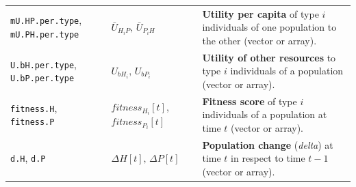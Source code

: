 \documentclass[
]{book}
\begin{document}
\begin{longtable}[]{@{}lll@{}}
\begin{minipage}[t]{0.36\columnwidth}
\texttt{mU.HP.per.type}, \texttt{mU.PH.per.type}\strut
\end{minipage} & \begin{minipage}[t]{0.21\columnwidth}\raggedright
\(\bar{U}_{H_{i}P},\,\bar{U}_{P_{i}H}\)\strut
\end{minipage} & \begin{minipage}[t]{0.34\columnwidth}\raggedright
\textbf{Utility per capita} of type \(i\) individuals of one population to the other (vector or array).\strut
\end{minipage}\tabularnewline
\begin{minipage}[t]{0.36\columnwidth}\raggedright
\texttt{U.bH.per.type}, \texttt{U.bP.per.type}\strut
\end{minipage} & \begin{minipage}[t]{0.21\columnwidth}\raggedright
\(U_{bH_{i}},\,U_{bP_{i}}\)\strut
\end{minipage} & \begin{minipage}[t]{0.34\columnwidth}\raggedright
\textbf{Utility of other resources} to type \(i\) individuals of a population (vector or array).\strut
\end{minipage}\tabularnewline
\begin{minipage}[t]{0.36\columnwidth}\raggedright
\texttt{fitness.H}, \texttt{fitness.P}\strut
\end{minipage} & \begin{minipage}[t]{0.21\columnwidth}\raggedright
\(fitness_{H_{i}}[t]\), \(fitness_{P_{i}}[t]\)\strut
\end{minipage} & \begin{minipage}[t]{0.34\columnwidth}\raggedright
\textbf{Fitness score} of type \(i\) individuals of a population at time \(t\) (vector or array).\strut
\end{minipage}\tabularnewline
\begin{minipage}[t]{0.36\columnwidth}\raggedright
\texttt{d.H}, \texttt{d.P}\strut
\end{minipage} & \begin{minipage}[t]{0.21\columnwidth}\raggedright
\(\Delta H[t],\,\Delta P[t]\)\strut
\end{minipage} & \begin{minipage}[t]{0.34\columnwidth}\raggedright
\textbf{Population change} (\emph{delta}) at time \(t\) in respect to time \(t -1\) (vector or array).\strut
\end{minipage}\tabularnewline
\bottomrule
\end{longtable}
\end{document}
